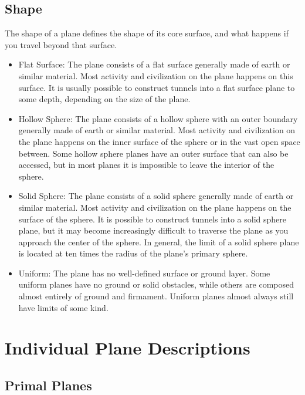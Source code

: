   \subsection{Shape} The shape of a plane defines the shape of its core surface, and what happens if you travel beyond that surface.

    \begin{itemize}
      \item Flat Surface: The plane consists of a flat surface generally made of earth or similar material.
        Most activity and civilization on the plane happens on this surface.
        It is usually possible to construct tunnels into a flat surface plane to some depth, depending on the size of the plane.
      \item Hollow Sphere: The plane consists of a hollow sphere with an outer boundary generally made of earth or similar material.
        Most activity and civilization on the plane happens on the inner surface of the sphere or in the vast open space between.
        Some hollow sphere planes have an outer surface that can also be accessed, but in most planes it is impossible to leave the interior of the sphere.
      \item Solid Sphere: The plane consists of a solid sphere generally made of earth or similar material.
        Most activity and civilization on the plane happens on the surface of the sphere.
        It is possible to construct tunnels into a solid sphere plane, but it may become increasingly difficult to traverse the plane as you approach the center of the sphere.
        In general, the limit of a solid sphere plane is located at ten times the radius of the plane's primary sphere.
      \item Uniform: The plane has no well-defined surface or ground layer.
        Some uniform planes have no ground or solid obstacles, while others are composed almost entirely of ground and firmament.
        Uniform planes almost always still have limits of some kind.
    \end{itemize}

\section{Individual Plane Descriptions}

  \subsection{Primal Planes}

